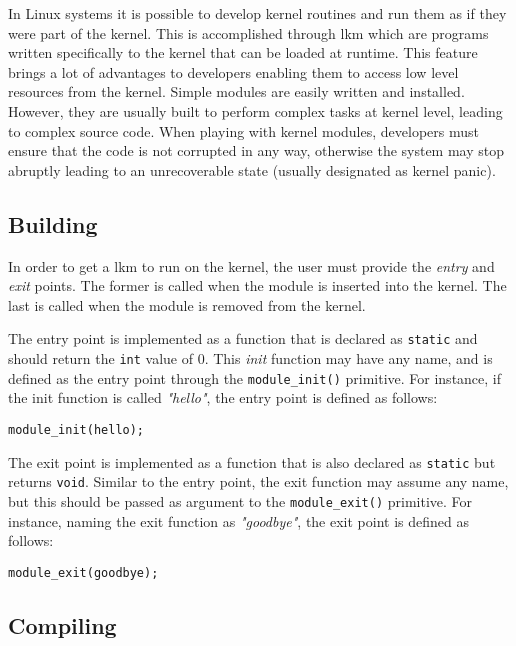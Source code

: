 In Linux systems it is possible to develop kernel routines and run them as if they were part of the kernel. This is accomplished through \gls{lkm} which are programs written specifically to the kernel that can be loaded at runtime. This feature brings a lot of advantages to developers enabling them to access low level resources from the kernel. Simple modules are easily written and installed. However, they are usually built to perform complex tasks at kernel level, leading to complex source code. When playing with kernel modules, developers must ensure that the code is not corrupted in any way, otherwise the system may stop abruptly leading to an unrecoverable state (usually designated as kernel panic).

\subsection{Building}

In order to get a \gls{lkm} to run on the kernel, the user must provide the \textit{entry} and \textit{exit} points. The former is called when the module is inserted into the kernel. The last is called when the module is removed from the kernel. 

The entry point is implemented as a function that is declared as \texttt{static} and should return the \texttt{int} value of 0. This \textit{init} function may have any name, and is defined as the entry point through the \texttt{module\_init()} primitive. For instance, if the init function is called \textit{"hello"}, the entry point is defined as follows:

\begin{lstlisting}[caption=Defining the Loadable Kernel Module's entry point]
module_init(hello);
\end{lstlisting}

The exit point is implemented as a function that is also declared as \texttt{static} but returns \texttt{void}. Similar to the entry point, the exit function may assume any name, but this should be passed as argument to the \texttt{module\_exit()} primitive. For instance, naming the exit function as \textit{"goodbye"}, the exit point is defined as follows:

\begin{lstlisting}[caption=Defining the Loadable Kernel Module's exit point]
module_exit(goodbye);
\end{lstlisting}

\subsection{Compiling}

